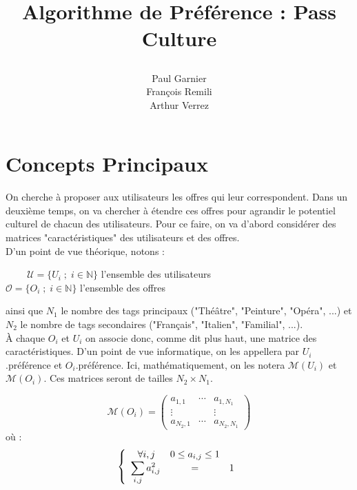\documentclass[11pt, oneside]{article}
\title{\begin{center} Algorithme de Préférence : Pass Culture \end{center}}
\author{Paul Garnier \\ François Remili \\ Arthur Verrez}
\begin{document}
\maketitle


\pagestyle{empty}

\maketitle





\pagestyle{plain}

\section{Concepts Principaux}

On cherche à proposer aux utilisateurs les offres qui leur correspondent. Dans un deuxième temps, on va chercher à étendre ces offres pour agrandir le potentiel culturel de chacun des utilisateurs. Pour ce faire, on va d'abord considérer des matrices "caractéristiques" des utilisateurs et des offres. \\

D'un point de vue théorique, notons :

\begin{center}

 $\;\;\;\;\;\;\;\;\mathcal{U} = \{U_i \; ; \; i \in \mathbb{N} \}$ l'ensemble des utilisateurs \\
$\mathcal{O} = \{O_i \; ; \; i \in \mathbb{N} \}$ l'ensemble des offres \\

\end{center}

ainsi que $N_1$ le nombre des tags principaux ("Théâtre", "Peinture", "Opéra", ...) et $N_2$ le nombre de tags secondaires ("Français", "Italien", "Familial", ...). \\

À chaque $O_i$ et $U_i$ on associe donc, comme dit plus haut, une matrice des caractéristiques. D'un point de vue informatique, on les appellera par $U_i$.préférence et $O_i$.préférence. Ici, mathématiquement, on les notera $\mathcal{M} (U_i)$ et $\mathcal{M} (O_i)$. Ces matrices seront de tailles $N_2 \times N_1$.

\begin{center}
\[
\mathcal{M} (O_i) =
\begin{pmatrix}
a_{1,1} & \cdots & a_{1,N_1} \\
\vdots & & \vdots \\
a_{N_2,1} & \cdots & a_{N_2,N_1}
\end{pmatrix}
\]
où :
\[
 \left \{
   \begin{array}{r c l}
      \forall i,j \; \; & 0 \leq a_{i,j} \leq 1 \\
      \displaystyle \sum_{i,j} a_{i,j}^{2} &=& 1 \\
   \end{array}
   \right .
\]
\end{center}
\end{document}
